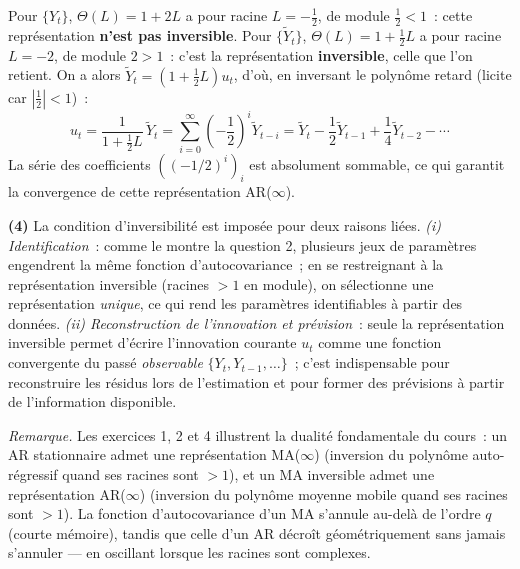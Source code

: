 \documentclass[11pt,a4paper,notitlepage]{article}
\newcommand{\question}[1]{\textbf{(#1)}}
\begin{document}
Pour $\{Y_t\}$, $\Theta(L) = 1 + 2L$ a pour racine $L = -\frac{1}{2}$,
de module $\frac{1}{2} < 1$~: cette représentation \textbf{n'est pas
inversible}. Pour $\{\tilde Y_t\}$, $\Theta(L) = 1 + \frac{1}{2}L$ a
pour racine $L = -2$, de module $2 > 1$~: c'est la représentation
\textbf{inversible}, celle que l'on retient. On a alors $\tilde Y_t =
(1+\frac{1}{2}L)u_t$, d'où, en inversant le polynôme retard (licite
car $|\frac{1}{2}|<1$)~:
\[
u_t = \frac{1}{1+\frac{1}{2}L}\,\tilde Y_t
= \sum_{i=0}^{\infty}\left(-\frac{1}{2}\right)^i \tilde Y_{t-i}
= \tilde Y_t - \frac{1}{2}\tilde Y_{t-1} + \frac{1}{4}\tilde Y_{t-2} - \cdots
\]
La série des coefficients $((-1/2)^i)_i$ est absolument sommable, ce
qui garantit la convergence de cette représentation AR($\infty$).\newline

\question{4} La condition d'inversibilité est imposée pour deux raisons
liées. \emph{(i) Identification}~: comme le montre la question 2,
plusieurs jeux de paramètres engendrent la même fonction
d'autocovariance~; en se restreignant à la représentation inversible
(racines $>1$ en module), on sélectionne une représentation
\emph{unique}, ce qui rend les paramètres identifiables à partir des
données. \emph{(ii) Reconstruction de l'innovation et prévision}~:
seule la représentation inversible permet d'écrire l'innovation
courante $u_t$ comme une fonction convergente du passé \emph{observable}
$\{Y_t,Y_{t-1},\dots\}$~; c'est indispensable pour reconstruire les
résidus lors de l'estimation et pour former des prévisions à partir de
l'information disponible.

\bigskip

\textit{Remarque.} Les exercices 1, 2 et 4 illustrent la dualité
fondamentale du cours~: un AR stationnaire admet une représentation
MA($\infty$) (inversion du polynôme auto-régressif quand ses racines
sont $>1$), et un MA inversible admet une représentation AR($\infty$)
(inversion du polynôme moyenne mobile quand ses racines sont $>1$). La
fonction d'autocovariance d'un MA s'annule au-delà de l'ordre $q$
(courte mémoire), tandis que celle d'un AR décroît géométriquement sans
jamais s'annuler --- en oscillant lorsque les racines sont complexes.
\end{document}
